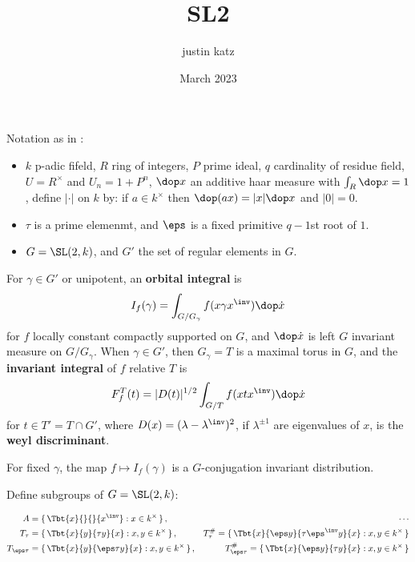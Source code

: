 \documentclass{article}
\title{SL2}
\author{justin katz}
\date{March 2023}
\begin{document}
Notation as in \cite{sallyFourierTransformOrbital1983}:
\begin{itemize}
    \item $k$ p-adic fifeld, $R$ ring of integers, $P$ prime ideal, $q$ cardinality of residue field, $U = R^\times$ and $U_n = 1 + P^n$, $\dop x$ an additive haar measure with $\int_R \dop x =1$, define $|\cdot|$ on $k$ by: if $a\in k^\times$ then $\dop(ax) = |x| \dop x$ and $|0|=0$. 
    \item $\tau$ is a prime elemenmt, and $\eps$ is a fixed primitive $q-1$st root of $1$. 
    \item $G = \SL(2,k)$, and $G'$ the set of regular elements in $G$. 
\end{itemize}

For $\gamma \in G'$ or unipotent, an \textbf{orbital integral} is
\begin{align*}
    I_f(\gamma) = \int_{G/G_\gamma}f(x \gamma x^\inv)\dop \dot{x} 
\end{align*}
for $f$ locally constant compactly supported on $G$, and $\dop \dot{x}$ is left $G$ invariant measure on $G/G_\gamma$. When $\gamma \in G'$, then $G_\gamma =T$ is a maximal torus in $G$, and the \textbf{invariant integral} of $f$ relative $T$ is 
\begin{align*}
    F_f^T(t) = |D(t)|^{1/2} \int_{G/T} f(xtx^\inv)\dop \dot{x}
\end{align*}
for $t\in T' = T\cap G'$, where $D(x) = (\lambda-\lambda^\inv)^2$, if $\lambda^{\pm 1}$ are eigenvalues of $x$, is the \textbf{weyl discriminant}. 

For fixed $\gamma$, the map $f\mapsto I_f(\gamma)$ is a $G$-conjugation invariant distribution. 

Define subgroups of $G=\SL(2,k)$:

\begin{align*}
    A &= \set{\Tbt{x}{}{}{x^\inv}: x \in k^\times},\quad& \cdots   \\
    T_\tau &= \set{\Tbt{x}{y}{\tau y}{x}: x,y \in k^\times},    &T_\tau^\# = \set{\Tbt{x}{\eps y}{\tau\eps^\inv y}{x}: x,y \in k^\times} \\
    T_{\eps \tau} &= \set{\Tbt{x}{y}{\eps \tau y}{x}: x,y \in k^\times}, &T_{\eps\tau}^\# = \set{\Tbt{x}{\eps y}{\tau y}{x}: x,y \in k^\times} 
\end{align*}




\end{document}
